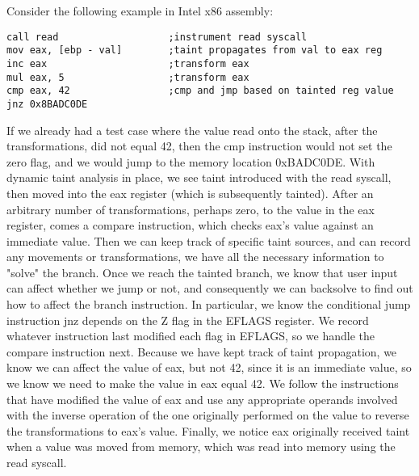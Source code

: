 \documentclass[11pt,expanded,copyright]{fsuthesis}
\begin{document}
Consider the following example in Intel x86 assembly:

\begin{lstlisting}[style=asmstyle]
call read					;instrument read syscall
mov eax, [ebp - val]		;taint propagates from val to eax reg
inc eax						;transform eax
mul eax, 5					;transform eax
cmp eax, 42					;cmp and jmp based on tainted reg value
jnz 0x8BADC0DE
\end{lstlisting}

If we already had a test case where the value read onto the stack, after the transformations, did not equal 42, then the cmp instruction would not set the zero flag, and we would jump to the memory location 0xBADC0DE. With dynamic taint analysis in place, we see taint introduced with the read syscall, then moved into the eax register (which is subsequently tainted). After an arbitrary number of transformations, perhaps zero, to the value in the eax register, comes a compare instruction, which checks eax's value against an immediate value. Then we can keep track of specific taint sources, and can record any movements or transformations, we have all the necessary information to "solve" the branch. Once we reach the tainted branch, we know that user input can affect whether we jump or not, and consequently we can backsolve to find out how to affect the branch instruction. In particular, we know the conditional jump instruction jnz depends on the Z flag in the EFLAGS register. We record whatever instruction last modified each flag in EFLAGS, so we handle the compare instruction next. Because we have kept track of taint propagation, we know we can affect the value of eax, but not 42, since it is an immediate value, so we know we need to make the value in eax equal 42. We follow the instructions that have modified the value of eax and use any appropriate operands involved with the inverse operation of the one originally performed on the value to reverse the transformations to eax's value. Finally, we notice eax originally received taint when a value was moved from memory, which was read into memory using the read syscall.
\end{document}
